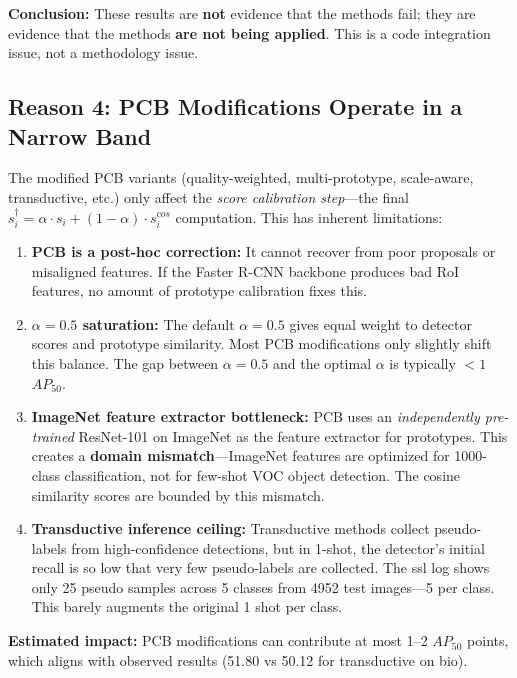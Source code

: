 \documentclass[11pt,a4paper]{article}
\begin{document}
\textbf{Conclusion:} These results are \textbf{not} evidence that the methods fail; they are evidence that the methods \textbf{are not being applied}. This is a code integration issue, not a methodology issue.

\subsection{Reason 4: PCB Modifications Operate in a Narrow Band}

The modified PCB variants (quality-weighted, multi-prototype, scale-aware, transductive, etc.) only affect the \textit{score calibration step}---the final $s_i^\dagger = \alpha \cdot s_i + (1-\alpha) \cdot s_i^{cos}$ computation. This has inherent limitations:

\begin{enumerate}[nosep]
    \item \textbf{PCB is a post-hoc correction:} It cannot recover from poor proposals or misaligned features. If the Faster R-CNN backbone produces bad RoI features, no amount of prototype calibration fixes this.

    \item \textbf{$\alpha = 0.5$ saturation:} The default $\alpha = 0.5$ gives equal weight to detector scores and prototype similarity. Most PCB modifications only slightly shift this balance. The gap between $\alpha=0.5$ and the optimal $\alpha$ is typically $<1$ $AP_{50}$.

    \item \textbf{ImageNet feature extractor bottleneck:} PCB uses an \textit{independently pre-trained} ResNet-101 on ImageNet as the feature extractor for prototypes. This creates a \textbf{domain mismatch}---ImageNet features are optimized for 1000-class classification, not for few-shot VOC object detection. The cosine similarity scores are bounded by this mismatch.

    \item \textbf{Transductive inference ceiling:} Transductive methods collect pseudo-labels from high-confidence detections, but in 1-shot, the detector's initial recall is so low that very few pseudo-labels are collected. The ssl log shows only 25 pseudo samples across 5 classes from 4952 test images---5 per class. This barely augments the original 1 shot per class.
\end{enumerate}

\textbf{Estimated impact:} PCB modifications can contribute at most 1--2 $AP_{50}$ points, which aligns with observed results (51.80 vs 50.12 for transductive on bio).
\end{document}
